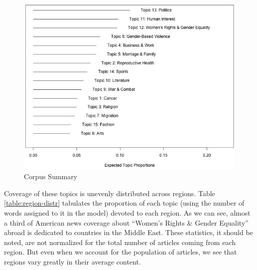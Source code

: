 \documentclass[11pt, oneside]{article}
\begin{document}
\begin{figure}[h]
\begin{center}
\caption{Corpus Summary}\label{fig:summary}
\includegraphics[scale=0.65]{corpus}
\end{center}
\end{figure}

Coverage of these topics is unevenly distributed across regions. Table \ref{table:region-distr} tabulates the proportion of each topic (using the number of words assigned to it in the model) devoted to each region. As we can see, almost a third of American news coverage about ``Women's Rights \& Gender Equality'' abroad is dedicated to countries in the Middle East. These statistics, it should be noted, are not normalized for the total number of articles coming from each region. But even when we account for the population of articles, we see that regions vary greatly in their average content. 
\end{document}
